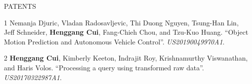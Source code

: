 \documentclass{resume} %
\begin{document}



\begin{rSection}{PATENTS}
\vspace{-.1in}
\small{
    \item
    [1]
        Nemanja Djuric, Vladan Radosavljevic, Thi Duong Nguyen, Tsung-Han Lin, Jeff Schneider, {\bf Henggang Cui}, Fang-Chieh Chou, and Tzu-Kuo Huang.
        ``Object Motion Prediction and Autonomous Vehicle Control''.
        \emph{US20190049970A1}.
    \item
    [2]
        {\bf Henggang Cui}, Kimberly Keeton, Indrajit Roy, Krishnamurthy Viswanathan, and Haris Volos.
        ``Processing a query using transformed raw data''.
        \emph{US20170322987A1}.
}
\end{rSection}
\vspace{-.05in}
\end{document}
